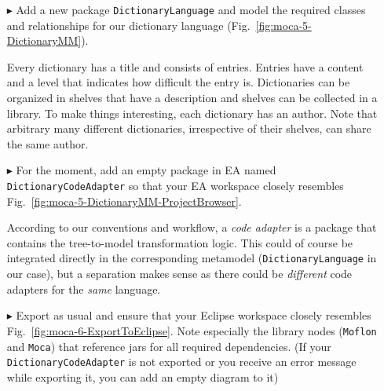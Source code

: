 \begin{enumerate}

\item[$\blacktriangleright$] Add a new package \texttt{DictionaryLanguage} and model the required classes and relationships for our dictionary language
(Fig.~\ref{fig:moca-5-DictionaryMM}).

Every dictionary has a title and consists of entries.
Entries have a content and a level that indicates how difficult the entry is.
Dictionaries can be organized in shelves that have a description and shelves can be collected in a library.
To make things interesting, each dictionary has an author.
Note that arbitrary many different dictionaries, irrespective of their shelves, can share the same author.


\item[$\blacktriangleright$] For the moment, add an empty package in EA named \texttt{Dic\-tion\-ary\-Code\-Adapter} so that your EA workspace closely resembles
Fig.~\ref{fig:moca-5-DictionaryMM-ProjectBrowser}.

According to our conventions and workflow, a \emph{code adapter} is a package that contains the tree-to-model transformation logic.
This could of course be integrated directly in the corresponding metamodel (\texttt{Dic\-tion\-ary\-Language} in our case), but a separation makes sense as
there could be \emph{different} code adapters for the \emph{same} language.


\item[$\blacktriangleright$] Export as usual and ensure that your Eclipse workspace closely resembles Fig.~\ref{fig:moca-6-ExportToEclipse}.
Note especially the library nodes (\texttt{Moflon} and \texttt{Moca}) that reference jars for all required dependencies. (If your
\texttt{Dictionary\-Code\-Adapter} is not exported or you receive an error message while exporting it, you can add an empty diagram to it)


\end{enumerate}
